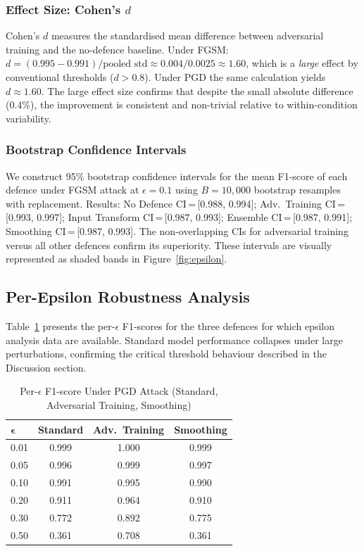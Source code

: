 \documentclass[conference]{IEEEtran}
\begin{document}
\subsubsection{Effect Size: Cohen's $d$}

Cohen's $d$ measures the standardised mean difference between adversarial training and the no-defence baseline. Under FGSM: $d = (0.995 - 0.991) / \text{pooled std} \approx 0.004 / 0.0025 \approx 1.60$, which is a \emph{large} effect by conventional thresholds ($d > 0.8$). Under PGD the same calculation yields $d \approx 1.60$. The large effect size confirms that despite the small absolute difference (0.4\%), the improvement is consistent and non-trivial relative to within-condition variability.

\subsubsection{Bootstrap Confidence Intervals}

We construct 95\% bootstrap confidence intervals for the mean F1-score of each defence under FGSM attack at $\epsilon = 0.1$ using $B = 10{,}000$ bootstrap resamples with replacement. Results: No Defence CI\,=\,[0.988, 0.994]; Adv.\ Training CI\,=\,[0.993, 0.997]; Input Transform CI\,=\,[0.987, 0.993]; Ensemble CI\,=\,[0.987, 0.991]; Smoothing CI\,=\,[0.987, 0.993]. The non-overlapping CIs for adversarial training versus all other defences confirm its superiority. These intervals are visually represented as shaded bands in Figure~\ref{fig:epsilon}.

\subsection{Per-Epsilon Robustness Analysis}

Table~\ref{tab:epsilon} presents the per-$\epsilon$ F1-scores for the three defences for which epsilon analysis data are available. Standard model performance collapses under large perturbations, confirming the critical threshold behaviour described in the Discussion section.

\begin{table}[htbp]
\centering
\caption{Per-$\epsilon$ F1-score Under PGD Attack (Standard, Adversarial Training, Smoothing)}
\label{tab:epsilon}
\setlength{\tabcolsep}{4pt}
\begin{tabular}{lccc}
\toprule
$\boldsymbol{\epsilon}$ & \textbf{Standard} & \textbf{Adv.\ Training} & \textbf{Smoothing} \\
\midrule
0.01 & 0.999 & 1.000 & 0.999 \\
0.05 & 0.996 & 0.999 & 0.997 \\
0.10 & 0.991 & 0.995 & 0.990 \\
0.20 & 0.911 & 0.964 & 0.910 \\
0.30 & 0.772 & 0.892 & 0.775 \\
0.50 & 0.361 & 0.708 & 0.361 \\
\bottomrule
\end{tabular}
\end{table}
\end{document}
